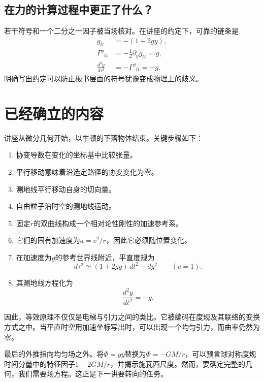 \subsection{在力的计算过程中更正了什么？}

若干符号和一个二分之一因子被当场核对。在讲座的约定下，可靠的链条是
\begin{equation}
\begin{aligned}
g_{tt}&=-(1+2gy),\\
\Gamma^y{}_{tt}&=-\frac12\partial_yg_{tt}=g,\\
\frac{d^2y}{d\tau^2}&=-\Gamma^y{}_{tt}=-g.
\end{aligned}
\end{equation}
明确写出约定可以防止板书层面的符号犹豫变成物理上的歧义。

\section{已经确立的内容}

讲座从微分几何开始，以牛顿的下落物体结束。关键步骤如下：
\begin{enumerate}
\item 协变导数在变化的坐标基中比较张量。
\item 平行移动意味着沿选定路径的协变变化为零。
\item 测地线平行移动自身的切向量。
\item 自由粒子沿时空的测地线运动。
\item 固定\(r\)的双曲线构成一个相对论性刚性的加速参考系。
\item 它们的固有加速度为\(a=c^2/r\)，因此它必须随位置变化。
\item 在加速度为\(g\)的参考世界线附近，平直度规为
\begin{equation}
d\tau^2\simeq(1+2gy)\,dt^2-dy^2
\qquad(c=1).
\end{equation}
\item 其测地线方程化为
\begin{equation}
\frac{d^2y}{dt^2}=-g.
\end{equation}
\end{enumerate}

因此，等效原理不仅仅是电梯与引力之间的类比。它被编码在度规及其联络的变换方式之中。当平直时空用加速坐标写出时，可以出现一个均匀引力，而曲率仍然为零。

最后的外推指向均匀场之外。将\(\Phi=gy\)替换为\(\Phi=-GM/r\)，可以预言球对称度规时间分量中的特征因子\(1-2GM/r\)，并揭示施瓦西尺度。然而，要确定完整的几何，我们需要场方程。这正是下一讲要转向的任务。
